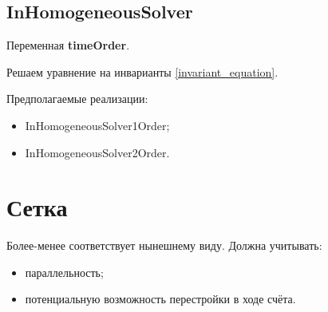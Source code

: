 \documentclass[a4paper,12pt]{article}
\numberwithin{equation}{section}
\begin{document}
\subsection{InHomogeneousSolver}
	Переменная \textbf{timeOrder}.
	
	Решаем уравнение на инварианты \eqref{invariant_equation}.
	
	Предполагаемые реализации:
		\begin{itemize}
			\item{InHomogeneousSolver1Order;}
			\item{InHomogeneousSolver2Order.}
		\end{itemize}


\section{Сетка}

Более-менее соответствует нынешнему виду. Должна учитывать: 
	\begin{itemize}
		\item{параллельность;}
		\item{потенциальную возможность перестройки в ходе счёта.}
	\end{itemize}
\end{document}
